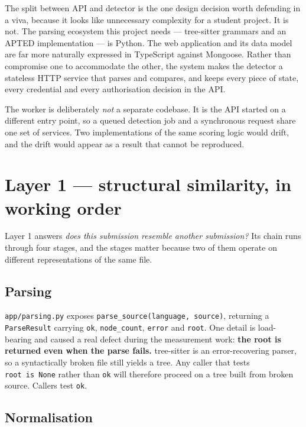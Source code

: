 The split between API and detector is the one design decision worth
defending in a viva, because it looks like unnecessary complexity for a
student project. It is not. The parsing ecosystem this project needs ---
tree-sitter grammars and an APTED implementation --- is Python. The web
application and its data model are far more naturally expressed in
TypeScript against Mongoose. Rather than compromise one to accommodate
the other, the system makes the detector a stateless HTTP service that
parses and compares, and keeps every piece of state, every credential
and every authorisation decision in the API.

The worker is deliberately \emph{not} a separate codebase. It is the API
started on a different entry point, so a queued detection job and a
synchronous request share one set of services. Two implementations of
the same scoring logic would drift, and the drift would appear as a
result that cannot be reproduced.

\hypertarget{layer-1-structural-similarity-in-working-order}{%
\section{Layer 1 --- structural similarity, in working
order}\label{layer-1-structural-similarity-in-working-order}}

Layer 1 answers \emph{does this submission resemble another submission?}
Its chain runs through four stages, and the stages matter because two of
them operate on different representations of the same file.

\hypertarget{parsing}{%
\subsection{Parsing}\label{parsing}}

\texttt{app/parsing.py} exposes
\texttt{parse\_source(language,\ source)}, returning a
\texttt{ParseResult} carrying \texttt{ok}, \texttt{node\_count},
\texttt{error} and \texttt{root}. One detail is load-bearing and caused
a real defect during the measurement work: \textbf{the root is returned
even when the parse fails.} tree-sitter \cite{treesitter} is an
error-recovering parser, so a syntactically broken file still yields a
tree. Any caller that tests \texttt{root\ is\ None} rather than
\texttt{ok} will therefore proceed on a tree built from broken source.
Callers test \texttt{ok}.

\hypertarget{normalisation}{%
\subsection{Normalisation}\label{normalisation}}

